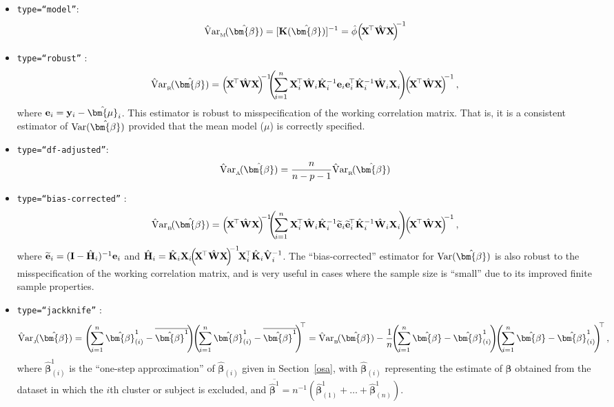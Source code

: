 \begin{itemize}
\item {\tt type=``model''}:
$${\rm \hat{V}ar}_{_{\rm M}}\!(\hat{\bm{\beta}})=[{\bf K}(\hat{\bm{\beta}})]^{-1}=\hat{\phi}\!\left(\!{\bf X}^{\!\top}\hat{\bf W}{\bf X}\!\right)^{\!\!-1}$$

\item {\tt type=``robust''} \citep{LZ86}:
$${\rm \hat{V}ar}_{_{\rm R}}\!(\hat{\bm{\beta}})=\left(\!{\bf X}^{\!\top}\hat{\bf W}{\bf X}\!\right)^{\!\!-1}\!\!\!\left(\!\sum\limits_{i=1}^n {\bf X}_i^{\!\top}\hat{\bf W}_i\hat{\bf K}_i^{-1}{\bf e}_i{\bf e}_i^{\!\top}\hat{\bf K}_i^{-1} \hat{\bf W}_i{\bf X}_i\!\right)\!\!\left(\!{\bf X}^{\!\top}\hat{\bf W}{\bf X}\!\right)^{\!\!-1},$$
where ${\bf e}_i={\bf y}_i-\hat{\bm{\mu}}_i$. This estimator is robust to misspecification of the working correlation matrix. That is, it is a consistent estimator of ${\rm Var}(\hat{\bm{\beta}})$ provided that the mean model ($\mu$) is correctly specified.

\item {\tt type=``df-adjusted''}:
$${\rm \hat{V}ar}_{_{\rm A}}\!(\hat{\bm{\beta}})=\dfrac{n}{n-p-1}{\rm \hat{V}ar}_{_{\rm R}}\!(\hat{\bm{\beta}})$$

\item {\tt type=``bias-corrected''} \citep{D01}:
$${\rm \hat{V}ar}_{_{\rm B}}\!(\hat{\bm{\beta}})=\left(\!{\bf X}^{\!\top}\hat{\bf W}{\bf X}\!\right)^{\!\!-1}\!\!\!\left(\!\sum\limits_{i=1}^n {\bf X}_i^{\!\top}\hat{\bf W}_i\hat{\bf K}_i^{-1}\widetilde{\bf e}_i\widetilde{\bf e}_i^{\!\top}\hat{\bf K}_i^{-1} \hat{\bf W}_i{\bf X}_i\!\right)\!\!\left(\!{\bf X}^{\!\top}\hat{\bf W}{\bf X}\!\right)^{\!\!-1},$$
where $\widetilde{\bf e}_i=({\bf I}-\hat{\bf H}_i)^{-1}{\bf e}_i$ and $\hat{\bf H}_i=\hat{\bf K}_i{\bf X}_i\!\!\left(\!{\bf X}^{\!\top}\hat{\bf W}{\bf X}\!\right)^{\!\!-1}\!\!{\bf X}_i^{\!\top}\hat{\bf K}_i\hat{\bf V}_i^{-1}$.
The ``bias-corrected'' estimator for ${\rm Var}(\hat{\bm{\beta}})$ is also robust to the misspecification of the working correlation matrix, and is very useful in cases where the sample size is ``small'' due to its improved finite sample properties.

\item {\tt type=``jackknife''} \citep{LLH90}:
$${\rm \hat{V}ar}_{_{\rm J}}\!(\hat{\bm{\beta}})=\left(\!\sum\limits_{i=1}^n \hat{\bm{\beta}}^{1}_{(i)}-\overline{\hat{\bm{\beta}}^{1}}\!\right)\!\!\left(\!\sum\limits_{i=1}^n \hat{\bm{\beta}}^{1}_{(i)}-\overline{\hat{\bm{\beta}}^{1}}\!\right)^{\!\!\top}={\rm \hat{V}ar}_{_{\rm B}}\!(\hat{\bm{\beta}})-\dfrac{1}{n}\!\!\left(\!\sum\limits_{i=1}^n \hat{\bm{\beta}}-\hat{\bm{\beta}}^{1}_{(i)}\!\right)\!\!\left(\!\sum\limits_{i=1}^n \hat{\bm{\beta}}-\hat{\bm{\beta}}^{1}_{(i)}\!\right)^{\!\!\top},$$
where $\hat{\bm{\beta}}^{1}_{(i)}$ is the ``one-step approximation'' of $\hat{\bm{\beta}}_{(i)}$ given in Section~\ref{osa}, with $\hat{\bm{\beta}}_{(i)}$ representing the estimate of $\bm{\beta}$ obtained from the dataset in which the $i$th cluster or subject is excluded, and $\overline{\hat{\bm{\beta}}^{1}}=n^{-1}(\hat{\bm{\beta}}^{1}_{(1)}+\ldots+\hat{\bm{\beta}}^{1}_{(n)})$.
\end{itemize}
